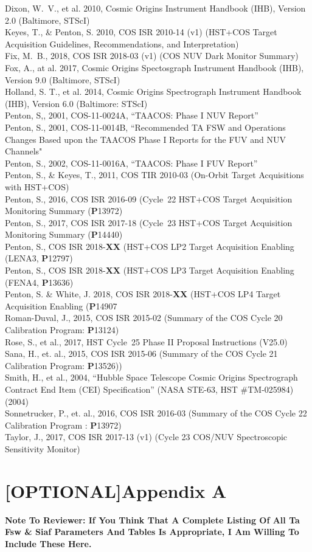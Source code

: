 \documentclass{stsci_report}
\newcommand{\pid}[1]{{\bf P}#1}
\begin{document}
\small
Dixon, W.~V., et al. 2010, Cosmic Origins Instrument Handbook (IHB), Version 2.0 (Baltimore, STScI)\\
Keyes, T., \& Penton, S. 2010, COS ISR 2010-14 (v1) (HST+COS Target Acquisition Guidelines, Recommendations, and Interpretation)\\
Fix, M.~B., 2018, COS ISR 2018-03 (v1) (COS NUV Dark Monitor Summary)\\
Fox, A., at al. 2017, Cosmic Origins Spectosgraph Instrument Handbook (IHB), Version 9.0 (Baltimore, STScI)\\
Holland, S. T., et al. 2014, Cosmic Origins Spectrograph Instrument Handbook (IHB), Version 6.0 (Baltimore: STScI)\\
Penton, S,, 2001, COS-11-0024A, ``TAACOS: Phase I NUV Report''\\
Penton, S., 2001, COS-11-0014B, ``Recommended TA FSW and Operations Changes Based upon the TAACOS Phase I Reports for the FUV and NUV Channels"\\
Penton, S., 2002, COS-11-0016A, ``TAACOS: Phase I FUV Report''\\
Penton, S., \& Keyes, T., 2011, COS TIR 2010-03 (On-Orbit Target Acquisitions with HST+COS)\\
Penton, S., 2016, COS ISR 2016-09 (Cycle~22 HST+COS Target Acquisition Monitoring Summary (\pid{13972})\\
Penton, S., 2017, COS ISR 2017-18 (Cycle~23 HST+COS Target Acquisition Monitoring Summary (\pid{14440})\\
Penton, S., COS ISR 2018-{\bf XX} (HST+COS LP2 Target Acquisition Enabling (LENA3, \pid{12797})\\
Penton, S., COS ISR 2018-{\bf XX} (HST+COS LP3 Target Acquisition Enabling (FENA4, \pid{13636})\\
Penton, S. \& White, J. 2018, COS ISR 2018-{\bf XX} (HST+COS LP4 Target Acquisition Enabling (\pid{14907}\\
Roman-Duval, J., 2015, COS ISR 2015-02 (Summary of the COS Cycle 20 Calibration Program: \pid{13124})\\
Rose, S., et al., 2017, HST Cycle~25 Phase II Proposal Instructions (V25.0)\\
Sana, H., et. al., 2015, COS ISR 2015-06 (Summary of the COS Cycle 21 Calibration Program: \pid{13526}))\\
Smith, H., et al., 2004, ``Hubble Space Telescope Cosmic Origins Spectrograph Contract End Item (CEI) Specification'' (NASA STE-63, HST \#TM-025984) (2004)\\
Sonnetrucker, P., et. al., 2016, COS ISR 2016-03 (Summary of the COS Cycle 22 Calibration Program : \pid{13972}) \\
Taylor, J., 2017, COS ISR 2017-13 (v1) (Cycle 23 COS/NUV Spectroscopic Sensitivity Monitor)\\
\normalsize
\newpage
\section{[OPTIONAL]Appendix A}\label{sec:Appendix}
{\bf Note To Reviewer: If You Think That A Complete Listing Of All Ta Fsw \& Siaf Parameters And Tables Is Appropriate, I Am Willing To Include These Here.}

%
\end{document}
